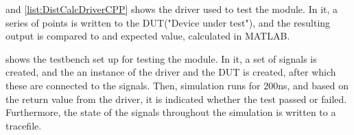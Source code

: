 



 and \cref{list:DistCalcDriverCPP} shows the driver used to test the module. In it, a series of points is written to the DUT("Device under test"), and the resulting output is compared to and expected value, calculated in MATLAB.

 shows the testbench set up for testing the module. In it, a set of signals is created, and the an instance of the driver and the DUT is created, after which these are connected to the signals. Then, simulation runs for 200ns, and based on the return value from the driver, it is indicated whether the test passed or failed. Furthermore, the state of the signals throughout the simulation is written to a tracefile.







